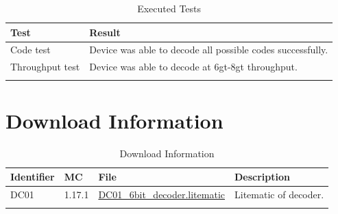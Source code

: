 \documentclass[10pt]{datasheet}
\begin{document}
\begin{table}[h]
\caption{Executed Tests}
\begin{tabularx}{\textwidth}{l | X}
    \thickhline
    \textbf{Test} & \textbf{Result} \\
    \hline
    Code test & Device was able to decode all possible codes successfully.\\
    \hline
    Throughput test & Device was able to decode at 6gt-8gt throughput.\\
    \thickhline
\end{tabularx}
\end{table}

\section{Download Information}
\begin{table}[h]
    \caption{Download Information}
    \begin{tabularx}{\textwidth}{l | l | l | X}
        \thickhline
        \textbf{Identifier} & \textbf{MC} & \textbf{File} & \textbf{Description} \\
        \hline
        DC01 & 1.17.1 & \href{https://github.com/Soontech-Annals/Archive/blob/92d3541e07ddc3ab90360e923907f040eca76834/Archive/decoders/DC01\%206\%20Bit\%20Binary\%20Decoder/DC01\_6bit\_decoder.litematic?raw=1}{DC01\_6bit\_decoder.litematic} & Litematic of decoder. \\
        \thickhline
    \end{tabularx}
\end{table}
\end{document}
